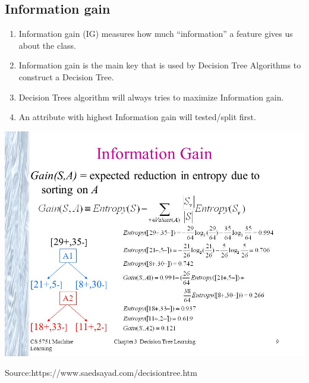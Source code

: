 \documentclass[a0,portrait]{a0poster}
\begin{document}
\begin{multicols}{3}
\subsection*{Information gain}
\begin{enumerate}
\item  Information gain (IG) measures how much “information” a feature gives us about the class.
\item Information gain is the main key that is used by Decision Tree Algorithms to construct a Decision Tree.
\item Decision Trees algorithm will always tries to maximize Information gain.
\item An attribute with highest Information gain will tested/split first.
\end{enumerate}
\begin{center}\vspace{1cm}
\includegraphics[width=0.8\linewidth]{gain.jpg}
\caption*{Source:https://www.saedsayad.com/decisiontree.htm}
\end{center}\vspace{1cm}


\end{multicols}
\end{document}
